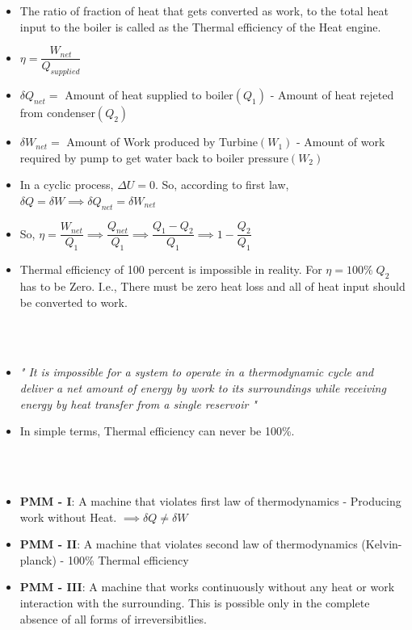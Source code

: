 \documentclass[8pt]{article}
\begin{document}
		\begin{itemize}[wide]
			\item The ratio of fraction of heat that gets converted as work, to the total heat input to the boiler is called as the Thermal efficiency of the Heat engine. 
			\item $\boxed{\eta=\dfrac{W_{net}}{Q_{supplied}}}$	
			\item $\delta Q_{net} =$ Amount of heat supplied to boiler$(Q_1)$ - Amount of heat rejeted from condenser$(Q_2)$
			\item $\delta W_{net} =$ Amount of Work produced by Turbine$(W_1)$ - Amount of work required by pump to get water back to boiler pressure$(W_2)$	
			\item In a cyclic process, $\Delta U = 0$. So, according to first law, $\delta Q = \delta W \implies \delta Q_{net} = \delta W_{net}$
			\item So, $\eta = \dfrac{W_{net}}{Q_1} \implies \dfrac{Q_{net}}{Q_1} \implies \dfrac{Q_1 - Q_2}{Q_1} \implies \boxed{1 - \dfrac{Q_2}{Q_1}}$
			\item Thermal efficiency of 100 percent is impossible in reality.  For $\eta = 100\%\; Q_2$ has to be Zero. I.e., There must be zero heat loss and all of heat input should be converted to work.   
		\end{itemize}
		\hrulefill\\
\\
			\begin{itemize}[wide]
				\item \textit{" It is impossible for a system to operate in a thermodynamic cycle and deliver a net amount of energy by work to its surroundings while receiving energy by heat transfer from a single reservoir "}
				\item In simple terms, Thermal efficiency can never be 100\%.
			\end{itemize}
		\hrulefill\\\pagebreak
\\
			\begin{itemize}
				\item \textbf{PMM - I}: A machine that violates first law of thermodynamics - Producing work without Heat. $\implies \delta Q \neq \delta W$
				\item \textbf{PMM - II}: A machine that violates second law of thermodynamics (Kelvin-planck) - 100\% Thermal efficiency
				\item \textbf{PMM - III}: A machine that works continuously without any heat or work interaction with the surrounding. This is possible only in the complete absence of all forms of irreversibitlies. 
			\end{itemize}
\end{document}

